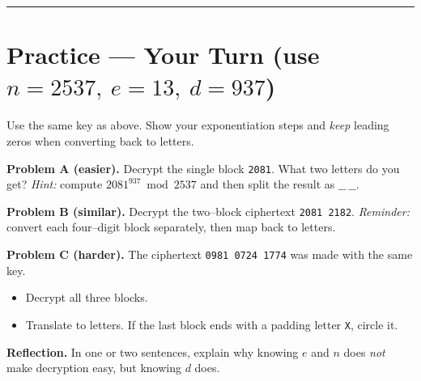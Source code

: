 \documentclass[12pt]{article}
\newcommand{\workbox}[1]{%
  \vspace{0.25em}\fbox{\parbox{\dimexpr\textwidth-2\fboxsep-2\fboxrule\relax}{\vspace{#1}}}%
}
\begin{document}
\bigskip
\hrule
\vspace{0.4em}
\section*{Practice — Your Turn (use \(n=2537,\ e=13,\ d=937\))}
Use the same key as above. Show your exponentiation steps and \emph{keep} leading zeros when converting back to letters.

\textbf{Problem A (easier).} Decrypt the single block \texttt{2081}. What two letters do you get?  
\emph{Hint:} compute \(2081^{937}\bmod 2537\) and then split the result as \(\_\_\ \_\_\).
\workbox{2.2cm}

\textbf{Problem B (similar).} Decrypt the two–block ciphertext \texttt{2081 2182}.  
\emph{Reminder:} convert each four–digit block separately, then map back to letters.
\workbox{2.6cm}

\textbf{Problem C (harder).} The ciphertext \texttt{0981 0724 1774} was made with the same key.  
\begin{itemize}[leftmargin=1.2em, topsep=0.2em,itemsep=0.2em]
\item Decrypt all three blocks.
\item Translate to letters. If the last block ends with a padding letter \texttt{X}, circle it.
\end{itemize}
\workbox{3.2cm}

\bigskip
\textbf{Reflection.} In one or two sentences, explain why knowing \(e\) and \(n\) does \emph{not} make decryption easy, but knowing \(d\) does.
\workbox{1.6cm}
\end{document}
